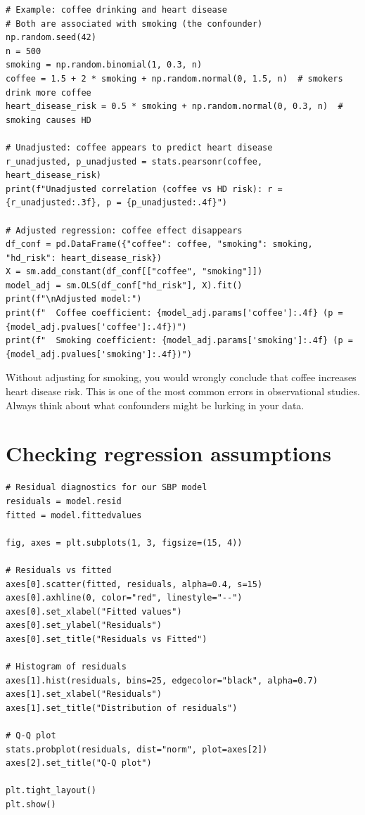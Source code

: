 \begin{verbatim}
# Example: coffee drinking and heart disease
# Both are associated with smoking (the confounder)
np.random.seed(42)
n = 500
smoking = np.random.binomial(1, 0.3, n)
coffee = 1.5 + 2 * smoking + np.random.normal(0, 1.5, n)  # smokers drink more coffee
heart_disease_risk = 0.5 * smoking + np.random.normal(0, 0.3, n)  # smoking causes HD

# Unadjusted: coffee appears to predict heart disease
r_unadjusted, p_unadjusted = stats.pearsonr(coffee, heart_disease_risk)
print(f"Unadjusted correlation (coffee vs HD risk): r = {r_unadjusted:.3f}, p = {p_unadjusted:.4f}")

# Adjusted regression: coffee effect disappears
df_conf = pd.DataFrame({"coffee": coffee, "smoking": smoking, "hd_risk": heart_disease_risk})
X = sm.add_constant(df_conf[["coffee", "smoking"]])
model_adj = sm.OLS(df_conf["hd_risk"], X).fit()
print(f"\nAdjusted model:")
print(f"  Coffee coefficient: {model_adj.params['coffee']:.4f} (p = {model_adj.pvalues['coffee']:.4f})")
print(f"  Smoking coefficient: {model_adj.params['smoking']:.4f} (p = {model_adj.pvalues['smoking']:.4f})")
\end{verbatim}

\begin{warningbox}
Without adjusting for smoking, you would wrongly conclude that coffee increases heart disease risk. This is one of the most common errors in observational studies. Always think about what confounders might be lurking in your data.
\end{warningbox}

\section{Checking regression assumptions}

\begin{verbatim}
# Residual diagnostics for our SBP model
residuals = model.resid
fitted = model.fittedvalues

fig, axes = plt.subplots(1, 3, figsize=(15, 4))

# Residuals vs fitted
axes[0].scatter(fitted, residuals, alpha=0.4, s=15)
axes[0].axhline(0, color="red", linestyle="--")
axes[0].set_xlabel("Fitted values")
axes[0].set_ylabel("Residuals")
axes[0].set_title("Residuals vs Fitted")

# Histogram of residuals
axes[1].hist(residuals, bins=25, edgecolor="black", alpha=0.7)
axes[1].set_xlabel("Residuals")
axes[1].set_title("Distribution of residuals")

# Q-Q plot
stats.probplot(residuals, dist="norm", plot=axes[2])
axes[2].set_title("Q-Q plot")

plt.tight_layout()
plt.show()
\end{verbatim}

